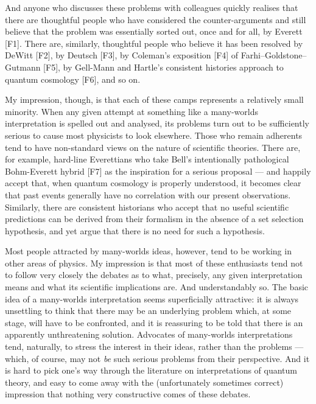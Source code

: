 \documentclass[aps,pra,12pt]{revtex4}
\begin{document}
And anyone who discusses these problems with colleagues quickly 
realises that there are thoughtful people who have considered
the counter-arguments and still believe 
that the problem was essentially sorted out, once and for all, 
by Everett [F1].  There are, similarly, thoughtful people who believe 
it has been resolved by DeWitt [F2], by Deutsch [F3],
by Coleman's exposition [F4] of Farhi--Goldstone--Gutmann [F5], by
Gell-Mann and Hartle's consistent histories approach to quantum
cosmology [F6], and so on.  

My impression, though, is that each of these camps represents a 
relatively small minority.  When any given attempt at something
like a many-worlds interpretation is spelled out and analysed, its 
problems turn out to be sufficiently serious to cause most 
physicists to look elsewhere.  Those who remain adherents 
tend to have non-standard views on the nature of scientific 
theories.    There are, for example, hard-line Everettians who
take Bell's intentionally pathological Bohm-Everett hybrid [F7] as
the inspiration for a serious proposal --- and happily accept 
that, when quantum cosmology is properly understood, 
it becomes clear that past events generally have no correlation 
with our present observations. 
Similarly, there are consistent historians who accept that no 
useful scientific predictions can be derived from their formalism
in the absence of a set selection hypothesis, and yet argue that
there is no need for such a hypothesis. 

Most people attracted by many-worlds ideas, however,
tend to be working in other areas of physics.
My impression is that most of these enthusiasts tend not to
follow very closely the debates as to what, precisely, any
given interpretation means and what its scientific implications
are.  And understandably so.  The basic idea of a many-worlds
interpretation seems superficially attractive: it is always 
unsettling to think that there may be an underlying 
problem which, at some stage, will have to be confronted, and 
it is reassuring to be told that there is an apparently
unthreatening solution.  Advocates of many-worlds interpretations 
tend, naturally, to stress the interest in their ideas, rather
than the problems --- which, of course, may not {\it be} such
serious problems from their perspective.  And it is hard to 
pick one's way through the literature on interpretations of 
quantum theory, and easy to come away with the (unfortunately 
sometimes correct) impression that nothing very constructive 
comes of these debates. 
\end{document}
